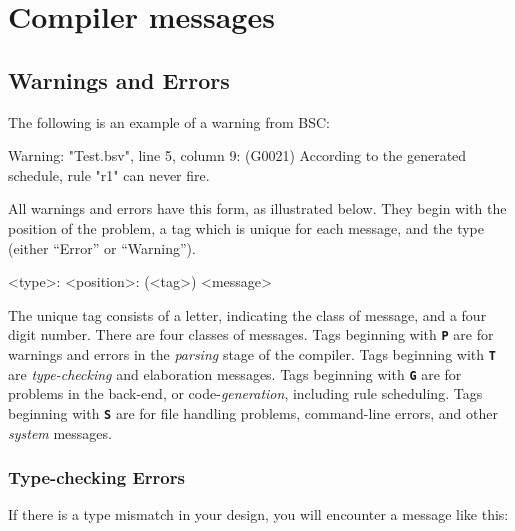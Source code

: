 \documentclass{article}
\newenvironment{centerboxverbatim}
  {\center
   \boxedverbatim}
  {\endboxedverbatim
  {\endcenter }}
\begin{document}

\section{Compiler messages}
\label{sec-messages}


\subsection{Warnings and Errors}

The following is an example of a warning from BSC:

\begin{centerboxverbatim}
Warning: "Test.bsv", line 5, column 9: (G0021)
  According to the generated schedule, rule "r1" can never fire.
\end{centerboxverbatim}

All warnings and errors have this form, as illustrated below.  They
begin with the position of the problem, a tag which is unique for each
message, and the type (either ``Error'' or ``Warning'').

\begin{centerboxverbatim}
<type>: <position>: (<tag>)
  <message>
\end{centerboxverbatim}


The unique tag consists of a letter, indicating the class of message,
and a four digit number.  There are four classes of messages.  Tags
beginning with {\bf\tt P} are for warnings and errors in the
\emph{parsing} stage of the compiler.  Tags beginning with {\bf\tt T}
are \emph{type-checking} and elaboration messages.  Tags beginning with
{\bf\tt G} are for problems in the back-end, or code-\emph{generation},
including rule scheduling.  Tags beginning with {\bf\tt S} are for
file handling problems, command-line errors, and other \emph{system}
messages.


\subsubsection{Type-checking Errors}

If there is a type mismatch in your design, you will encounter
a message like this:
\end{document}
